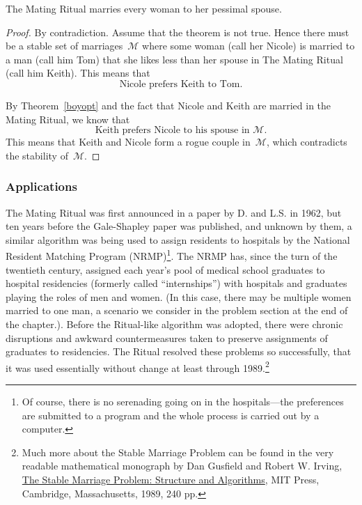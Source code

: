 \begin{theorem}
The Mating Ritual marries every woman to her pessimal spouse.
\end{theorem}

\begin{proof}
By contradiction.  Assume that the theorem is not true.  Hence there
must be a stable set of marriages~$\mathcal{M}$ where some woman (call
her Nicole) is married to a man (call him Tom) that she likes less
than her spouse in The Mating Ritual (call him Keith).  This means
that
\begin{equation}
\text{Nicole prefers Keith to Tom.} \tag{+}
\end{equation}

By Theorem~\ref{boyopt} and the fact that Nicole and Keith are married
in the Mating Ritual, we know that 
\begin{equation}\tag{++}
\text{Keith prefers Nicole to his spouse in~$\mathcal{M}$.}
\end{equation}
This means that Keith and Nicole form a rogue couple in~$\mathcal{M}$,
which contradicts the stability of~$\mathcal{M}$.
\end{proof}

\subsubsection{Applications}

The Mating Ritual was first announced in a paper by D.  and
L.S.  in 1962, but ten years before the Gale-Shapley
paper was published, and unknown by them, a similar algorithm was
being used to assign residents to hospitals by the National Resident
Matching Program (NRMP)\footnote{Of course, there is no serenading
  going on in the hospitals---the preferences are submitted to a
  program and the whole process is carried out by a computer.}.  The
NRMP has, since the turn of the twentieth century, assigned each
year's pool of medical school graduates to hospital residencies
(formerly called ``internships'') with hospitals and graduates playing
the roles of men and women.  (In this case, there may be multiple
women married to one man, a scenario we consider in the problem
section at the end of the chapter.).  Before the Ritual-like algorithm
was adopted, there were chronic disruptions and awkward
countermeasures taken to preserve assignments of graduates to
residencies.  The Ritual resolved these problems so successfully, that
it was used essentially without change at least through
1989.\footnote{Much more about the Stable Marriage Problem can be
  found in the very readable mathematical monograph by Dan Gusfield
  and Robert W. Irving,
  \href{http://mitpress.mit.edu/catalog/item/default.asp?ttype=2&tid=7676}{The
    Stable Marriage Problem: Structure and Algorithms}, MIT Press,
  Cambridge, Massachusetts, 1989, 240 pp.}

